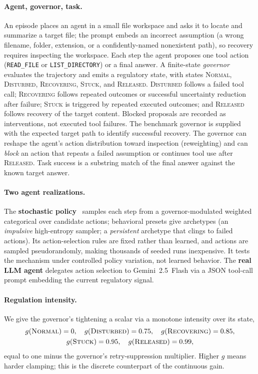 \documentclass[11pt]{article}
\begin{document}
\paragraph{Agent, governor, task.}
An episode places an agent in a small file workspace and asks it to locate and
summarize a target file; the prompt embeds an incorrect assumption (a wrong
filename, folder, extension, or a confidently-named nonexistent path), so
recovery requires inspecting the workspace. Each step the agent proposes one
tool action (\texttt{READ\_FILE} or \texttt{LIST\_DIRECTORY}) or a final
answer. A finite-state \emph{governor} evaluates the trajectory and emits a
regulatory state, with states \textsc{Normal}, \textsc{Disturbed}, \textsc{Recovering},
\textsc{Stuck}, and \textsc{Released}. \textsc{Disturbed} follows a failed
tool call; \textsc{Recovering} follows repeated outcomes or successful
uncertainty reduction after failure; \textsc{Stuck} is triggered by repeated
executed outcomes; and \textsc{Released} follows recovery of the target
content. Blocked proposals are recorded as interventions, not executed tool
failures. The benchmark governor is supplied with the expected target path to
identify successful recovery.
The governor can reshape the agent's action distribution toward inspection
(reweighting) and can \emph{block} an action that repeats a failed assumption
or continues tool use after \textsc{Released}. Task success is a substring
match of the final answer against the known target answer.

\paragraph{Two agent realizations.}
The \textbf{stochastic policy}~\cite{sutton2018rl} samples each step from a governor-modulated
weighted categorical over candidate actions; behavioral presets give
archetypes (an \emph{impulsive} high-entropy sampler; a \emph{persistent}
archetype that clings to failed actions). Its action-selection rules are fixed
rather than learned, and actions are sampled pseudorandomly, making thousands
of seeded runs inexpensive. It tests the mechanism under controlled policy
variation, not learned behavior. The \textbf{real LLM agent} delegates action
selection to Gemini~2.5~Flash via a JSON tool-call prompt embedding the current
regulatory signal.

\paragraph{Regulation intensity.}
We give the governor's tightening a scalar via a monotone intensity over its
state,
\begin{equation}
\begin{gathered}
g(\textsc{Normal})=0,\quad
g(\textsc{Disturbed})=0.75,\quad
g(\textsc{Recovering})=0.85,\\
g(\textsc{Stuck})=0.95,\quad
g(\textsc{Released})=0.99,
\end{gathered}
\label{eq:intensity}
\end{equation}
equal to one minus the governor's retry-suppression multiplier. Higher $g$
means harder clamping; this is the discrete counterpart of the continuous gain.
\end{document}

